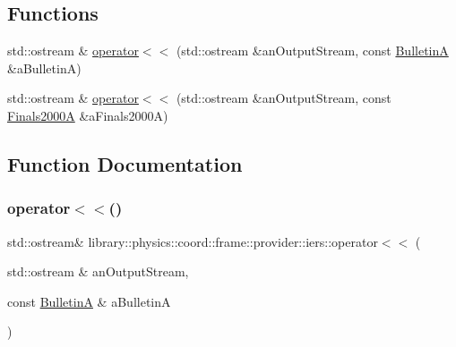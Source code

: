 \subsection*{Functions}
\begin{DoxyCompactItemize}
\item 
std\+::ostream \& \hyperlink{namespacelibrary_1_1physics_1_1coord_1_1frame_1_1provider_1_1iers_a07458b824777a56a263317f7c6351bda}{operator$<$$<$} (std\+::ostream \&an\+Output\+Stream, const \hyperlink{classlibrary_1_1physics_1_1coord_1_1frame_1_1provider_1_1iers_1_1_bulletin_a}{BulletinA} \&a\+BulletinA)
\item 
std\+::ostream \& \hyperlink{namespacelibrary_1_1physics_1_1coord_1_1frame_1_1provider_1_1iers_a5f470e0a9b85d66ce6e8b07f26c3c342}{operator$<$$<$} (std\+::ostream \&an\+Output\+Stream, const \hyperlink{classlibrary_1_1physics_1_1coord_1_1frame_1_1provider_1_1iers_1_1_finals2000_a}{Finals2000A} \&a\+Finals2000A)
\end{DoxyCompactItemize}


\subsection{Function Documentation}
\mbox{\label{namespacelibrary_1_1physics_1_1coord_1_1frame_1_1provider_1_1iers_a07458b824777a56a263317f7c6351bda}} 
\subsubsection{\texorpdfstring{operator$<$$<$()}{operator<<()}\hspace{0.1cm}{\footnotesize\ttfamily [1/2]}}
{\footnotesize\ttfamily std\+::ostream\& library\+::physics\+::coord\+::frame\+::provider\+::iers\+::operator$<$$<$ (\begin{DoxyParamCaption}\item[{std\+::ostream \&}]{an\+Output\+Stream,  }\item[{const \hyperlink{classlibrary_1_1physics_1_1coord_1_1frame_1_1provider_1_1iers_1_1_bulletin_a}{BulletinA} \&}]{a\+BulletinA }\end{DoxyParamCaption})}

